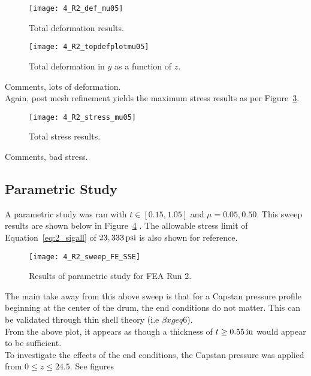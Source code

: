 \begin{figure}[H]
	\centering
	\texttt{[image: 4\_R2\_def\_mu05]}
	\caption{Total deformation results.}
	\label{fig:4_R2_def_mu05}
\end{figure}
\begin{figure}[H]
	\centering
	\texttt{[image: 4\_R2\_topdefplotmu05]}
	\caption{Total deformation in $y$ as a function of $z$.}
	\label{fig:4_R2_topdefplotmu05}
\end{figure}

Comments, lots of deformation.\\

Again, post mesh refinement yields the maximum stress results as per Figure~\ref{fig:4_R2_stress_mu05}.

\begin{figure}[H]
	\centering
	\texttt{[image: 4\_R2\_stress\_mu05]}
	\caption{Total stress results.}
	\label{fig:4_R2_stress_mu05}
\end{figure}

Comments, bad stress.


\subsection{Parametric Study}

A parametric study was ran with  $t\in [0.15, 1.05]$ and $\mu =0.05, 0.50$. This sweep results are shown below in Figure~\ref{fig:4_R2_sweep} \cite{EXCEL}.  The allowable stress limit of Equation~\ref{eq:2_sigall} of $23,333 \,\mathrm{psi}$ is also shown for reference.

\begin{figure}[H]
	\centering
	\texttt{[image: 4\_R2\_sweep\_FE\_SSE]}
	\caption{Results of parametric study for FEA Run 2.}
	\label{fig:4_R2_sweep}
\end{figure}

The main take away from this above sweep is that for a Capstan pressure profile beginning at the center of the drum, the end conditions do not matter. This can be validated through thin shell theory (i.e $\beta x geq 6$).\\

From the above plot, it appears as though a thickness of $t \geq 0.55 \,\mathrm{in}$ would appear to be sufficient.\\

To investigate the effects of the end conditions, the Capstan pressure was applied from $0 \leq z \leq 24.5$. See figures 



